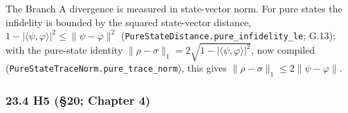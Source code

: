 \documentclass[
]{article}
\begin{document}
The Branch A divergence is measured in state-vector norm. For pure
states the infidelity is bounded by the squared state-vector distance,
\(1-|\langle\psi,\varphi\rangle|^2\le\|\psi-\varphi\|^2\)
(\texttt{P\allowbreak{}u\allowbreak{}r\allowbreak{}e\allowbreak{}S\allowbreak{}t\allowbreak{}a\allowbreak{}t\allowbreak{}e\allowbreak{}D\allowbreak{}i\allowbreak{}s\allowbreak{}t\allowbreak{}a\allowbreak{}n\allowbreak{}c\allowbreak{}e\allowbreak{}.\allowbreak{}p\allowbreak{}u\allowbreak{}r\allowbreak{}e\allowbreak{}\_\allowbreak{}i\allowbreak{}n\allowbreak{}f\allowbreak{}i\allowbreak{}d\allowbreak{}e\allowbreak{}l\allowbreak{}i\allowbreak{}t\allowbreak{}y\allowbreak{}\_\allowbreak{}l\allowbreak{}e};
G.13); with the pure-state identity
\(\|\rho-\sigma\|_1=2\sqrt{1-|\langle\psi,\varphi\rangle|^2}\), now
compiled
(\texttt{P\allowbreak{}u\allowbreak{}r\allowbreak{}e\allowbreak{}S\allowbreak{}t\allowbreak{}a\allowbreak{}t\allowbreak{}e\allowbreak{}T\allowbreak{}r\allowbreak{}a\allowbreak{}c\allowbreak{}e\allowbreak{}N\allowbreak{}o\allowbreak{}r\allowbreak{}m\allowbreak{}.\allowbreak{}p\allowbreak{}u\allowbreak{}r\allowbreak{}e\allowbreak{}\_\allowbreak{}t\allowbreak{}r\allowbreak{}a\allowbreak{}c\allowbreak{}e\allowbreak{}\_\allowbreak{}n\allowbreak{}o\allowbreak{}r\allowbreak{}m}),
this gives \(\|\rho-\sigma\|_1\le2\|\psi-\varphi\|\).

\subsubsection{23.4 H5 (§20; Chapter 4)}\label{h5-20-chapter-4}
\end{document}
